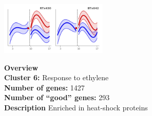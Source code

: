 \begin{multicols}{2}
\includegraphics[width=2in]{figures/clusters/root_Postflowering_5.png}
\columnbreak

\noindent \textbf{Overview}\\\textbf{Cluster 6:} Response to ethylene \\
\textbf{Number of genes:} 1427 \\
\textbf{Number of ``good'' genes:} 293 \\
\textbf{Description} Enriched in heat-shock proteins \\
\end{multicols}

